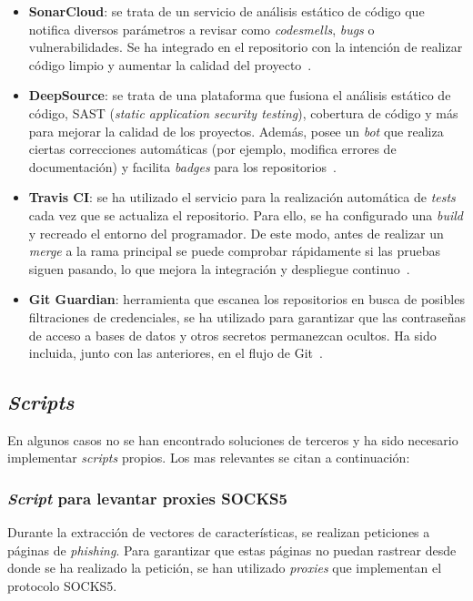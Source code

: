 \begin{itemize}
	\item \textbf{SonarCloud}: se trata de un servicio de análisis estático de código que notifica diversos parámetros a revisar como \textit{codesmells}, \textit{bugs} o vulnerabilidades. Se ha integrado en el repositorio con la intención de realizar código limpio y aumentar la calidad del proyecto~\cite{sonarCloud}.
	\item \textbf{DeepSource}: se trata de una plataforma que fusiona el análisis estático de código, SAST (\textit{static application security testing}), cobertura de código y más para mejorar la calidad de los proyectos. Además, posee un \textit{bot} que realiza ciertas correcciones automáticas (por ejemplo, modifica errores de documentación) y facilita \textit{badges} para los repositorios~\cite{deepSourceBot}.
	\item \textbf{Travis CI}: se ha utilizado el servicio para la realización automática de \textit{tests} cada vez que se actualiza el repositorio. Para ello, se ha configurado una \textit{build} y recreado el entorno del programador. De este modo, antes de realizar un \textit{merge} a la rama principal se puede comprobar rápidamente si las pruebas siguen pasando, lo que mejora la integración y despliegue continuo~\cite{travisCI}.
	\item \textbf{Git Guardian}: herramienta que escanea los repositorios en busca de posibles filtraciones de credenciales, se ha utilizado para garantizar que las contraseñas de acceso a bases de datos y otros secretos permanezcan ocultos. Ha sido incluida, junto con las anteriores, en el flujo de Git~\cite{gitGuardian}.
\end{itemize}


\subsection{\textit{Scripts}} 

En algunos casos no se han encontrado soluciones de terceros y ha sido necesario implementar \textit{scripts} propios. Los mas relevantes se citan a continuación:

\subsubsection{\textit{Script} para levantar proxies SOCKS5}
\label{sec:script_tor}
Durante la extracción de vectores de características, se realizan peticiones a páginas de \textit{phishing}. Para garantizar que estas páginas no puedan rastrear desde donde se ha realizado la petición, se han utilizado \textit{proxies} que implementan el protocolo SOCKS5.

